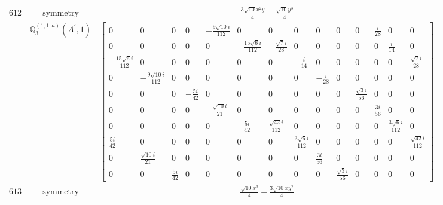 \documentclass[fleqn,8pt,landscape]{jsarticle}
\begin{document}
\begin{longtable}{ccc}
$ 612 $ & $ \text{symmetry} $ & $ \frac{3 \sqrt{10} x^{2} y}{4} - \frac{\sqrt{10} y^{3}}{4} $ \\
$  $ & $ \mathbb{Q}_{3}^{(1,1;a)}(A^{\prime},1) $ & $ \begin{bmatrix} 0 & 0 & 0 & 0 & - \frac{9 \sqrt{10} i}{112} & 0 & 0 & 0 & 0 & 0 & 0 & \frac{i}{28} & 0 & 0 \\ 0 & 0 & 0 & 0 & 0 & - \frac{15 \sqrt{6} i}{112} & - \frac{\sqrt{7} i}{28} & 0 & 0 & 0 & 0 & 0 & \frac{i}{14} & 0 \\ - \frac{15 \sqrt{6} i}{112} & 0 & 0 & 0 & 0 & 0 & 0 & - \frac{i}{14} & 0 & 0 & 0 & 0 & 0 & \frac{\sqrt{7} i}{28} \\ 0 & - \frac{9 \sqrt{10} i}{112} & 0 & 0 & 0 & 0 & 0 & 0 & - \frac{i}{28} & 0 & 0 & 0 & 0 & 0 \\ 0 & 0 & 0 & - \frac{5 i}{42} & 0 & 0 & 0 & 0 & 0 & 0 & \frac{\sqrt{3} i}{56} & 0 & 0 & 0 \\ 0 & 0 & 0 & 0 & - \frac{\sqrt{10} i}{21} & 0 & 0 & 0 & 0 & 0 & 0 & \frac{3 i}{56} & 0 & 0 \\ 0 & 0 & 0 & 0 & 0 & - \frac{5 i}{42} & \frac{\sqrt{42} i}{112} & 0 & 0 & 0 & 0 & 0 & \frac{3 \sqrt{6} i}{112} & 0 \\ \frac{5 i}{42} & 0 & 0 & 0 & 0 & 0 & 0 & \frac{3 \sqrt{6} i}{112} & 0 & 0 & 0 & 0 & 0 & \frac{\sqrt{42} i}{112} \\ 0 & \frac{\sqrt{10} i}{21} & 0 & 0 & 0 & 0 & 0 & 0 & \frac{3 i}{56} & 0 & 0 & 0 & 0 & 0 \\ 0 & 0 & \frac{5 i}{42} & 0 & 0 & 0 & 0 & 0 & 0 & \frac{\sqrt{3} i}{56} & 0 & 0 & 0 & 0 \end{bmatrix} $ \\ \hline
$ 613 $ & $ \text{symmetry} $ & $ \frac{\sqrt{10} x^{3}}{4} - \frac{3 \sqrt{10} x y^{2}}{4} $ \\

\end{longtable}
\end{document}
